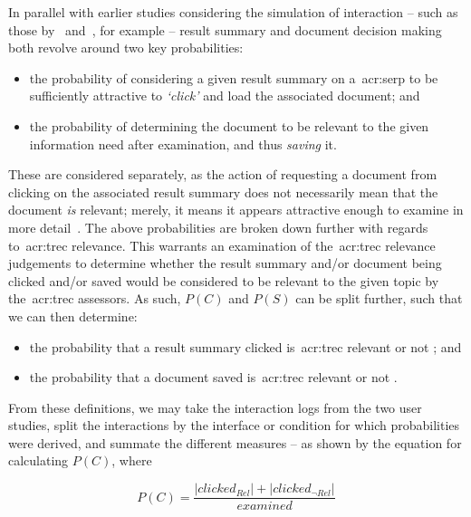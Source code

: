 In parallel with earlier studies considering the simulation of interaction -- such as those by~\cite{yilmaz2010browsing_utility} and~\cite{baskaya2013behavioural_factors}, for example -- result summary and document decision making both revolve around two key probabilities:

\begin{itemize}
    \item{the probability  of considering a given result summary on a~\gls{acr:serp} to be sufficiently attractive to \emph{`click'} and load the associated document; and}
    \item{the probability  of determining the document to be relevant to the given information need after examination, and thus \emph{saving} it.}
\end{itemize}

These are considered separately, as the action of requesting a document from clicking on the associated result summary does not necessarily mean that the document \emph{is} relevant; merely, it means it appears attractive enough to examine in more detail~\citep{turpin2009summaries}. The above probabilities are broken down further with regards to~\gls{acr:trec} relevance. This warrants an examination of the~\gls{acr:trec} relevance judgements to determine whether the result summary and/or document being clicked and/or saved would be considered to be relevant to the given topic by the~\gls{acr:trec} assessors. As such, $P(C)$ and $P(S)$ can be split further, such that we can then determine:

\begin{itemize}
    \item{the probability that a result summary clicked is~\gls{acr:trec} relevant  or not ; and}
    \item{the probability that a document saved is~\gls{acr:trec} relevant  or not .}
\end{itemize}

From these definitions, we may take the interaction logs from the two user studies, split the interactions by the interface or condition for which probabilities were derived, and summate the different measures -- as shown by the equation for calculating $P(C)$, where

\begin{equation}
    P(C) = \frac{|clicked_{Rel}| + |clicked_{\neg Rel}|}{examined}
\end{equation}

